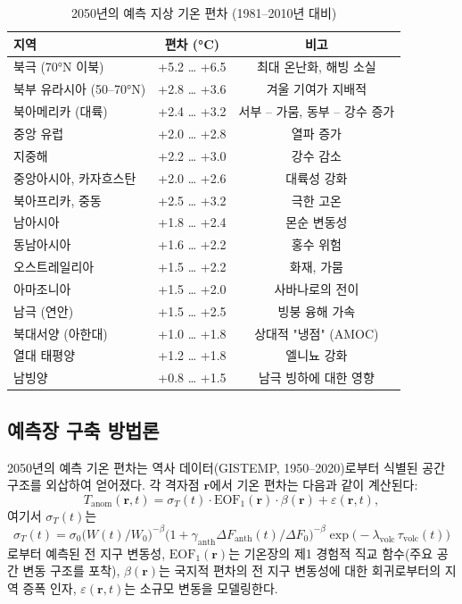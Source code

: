 \documentclass[11pt,a4paper]{article}
\begin{document}
	\begin{table}[htbp]
		\centering
		\caption{2050년의 예측 지상 기온 편차 (1981–2010년 대비)}
		\label{tab:anomalies_2050}
		\small
		\begin{tabular}{p{4.5cm} c c}
			\toprule
			지역 & 편차 (°C) & 비고 \\
			\midrule
			북극 (70°N 이북) & +5.2 … +6.5 & 최대 온난화, 해빙 소실 \\
			북부 유라시아 (50–70°N) & +2.8 … +3.6 & 겨울 기여가 지배적 \\
			북아메리카 (대륙) & +2.4 … +3.2 & 서부 – 가뭄, 동부 – 강수 증가 \\
			중앙 유럽 & +2.0 … +2.8 & 열파 증가 \\
			지중해 & +2.2 … +3.0 & 강수 감소 \\
			중앙아시아, 카자흐스탄 & +2.0 … +2.6 & 대륙성 강화 \\
			북아프리카, 중동 & +2.5 … +3.2 & 극한 고온 \\
			남아시아 & +1.8 … +2.4 & 몬순 변동성 \\
			동남아시아 & +1.6 … +2.2 & 홍수 위험 \\
			오스트레일리아 & +1.5 … +2.2 & 화재, 가뭄 \\
			아마조니아 & +1.5 … +2.0 & 사바나로의 전이 \\
			남극 (연안) & +1.5 … +2.5 & 빙붕 융해 가속 \\
			북대서양 (아한대) & +1.0 … +1.8 & 상대적 "냉점" (AMOC) \\
			열대 태평양 & +1.2 … +1.8 & 엘니뇨 강화 \\
			남빙양 & +0.8 … +1.5 & 남극 빙하에 대한 영향 \\
			\bottomrule
		\end{tabular}
	\end{table}
	
	\subsection{예측장 구축 방법론}
	
	2050년의 예측 기온 편차는 역사 데이터(GISTEMP, 1950–2020)로부터 식별된 공간 구조를 외삽하여 얻어졌다. 각 격자점 $\mathbf{r}$에서 기온 편차는 다음과 같이 계산된다:
	\[
	T_{\mathrm{anom}}(\mathbf{r},t) = \sigma_T(t) \cdot \mathrm{EOF}_1(\mathbf{r}) \cdot \beta(\mathbf{r}) + \varepsilon(\mathbf{r},t),
	\]
	여기서 $\sigma_T(t)$는
	\[
	\sigma_T(t) = \sigma_0 \bigl( W(t)/W_0 \bigr)^{-\beta} \bigl(1 + \gamma_{\mathrm{anth}} \Delta F_{\mathrm{anth}}(t)/\Delta F_0\bigr)^{-\beta} \exp\!\bigl(-\lambda_{\text{volc}} \,\tau_{\text{volc}}(t)\bigr)
	\]
	로부터 예측된 전 지구 변동성, $\mathrm{EOF}_1(\mathbf{r})$는 기온장의 제1 경험적 직교 함수(주요 공간 변동 구조를 포착), $\beta(\mathbf{r})$는 국지적 편차의 전 지구 변동성에 대한 회귀로부터의 지역 증폭 인자, $\varepsilon(\mathbf{r},t)$는 소규모 변동을 모델링한다.
	
\end{document}

